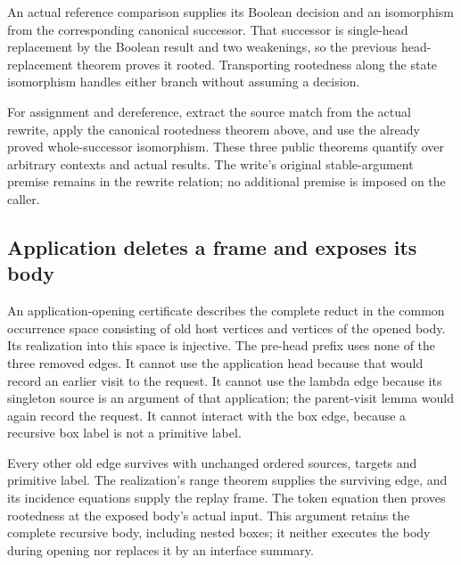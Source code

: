 An actual reference comparison supplies its Boolean decision and an
isomorphism from the corresponding canonical successor. That successor is
single-head replacement by the Boolean result and two weakenings, so the
previous head-replacement theorem proves it rooted. Transporting rootedness
along the state isomorphism handles either branch without assuming a decision.

For assignment and dereference, extract the source match from the actual
rewrite, apply the canonical rootedness theorem above, and use the already
proved whole-successor isomorphism. These three public theorems quantify over
arbitrary contexts and actual results. The write's original stable-argument
premise remains in the rewrite relation; no additional premise is imposed on
the caller.




\subsection{Application deletes a frame and exposes its body}

An application-opening certificate describes the complete reduct in the
common occurrence space consisting of old host vertices and vertices of the
opened body. Its realization into this space is injective. The pre-head prefix
uses none of the three removed edges. It cannot use the application head
because that would record an earlier visit to the request. It cannot use the
lambda edge because its singleton source is an argument of that application;
the parent-visit lemma would again record the request. It cannot interact with
the box edge, because a recursive box label is not a primitive label.

Every other old edge survives with unchanged ordered sources, targets and
primitive label. The realization's range theorem supplies the surviving edge,
and its incidence equations supply the replay frame. The token equation then
proves rootedness at the exposed body's actual input. This argument retains
the complete recursive body, including nested boxes; it neither executes the
body during opening nor replaces it by an interface summary.


